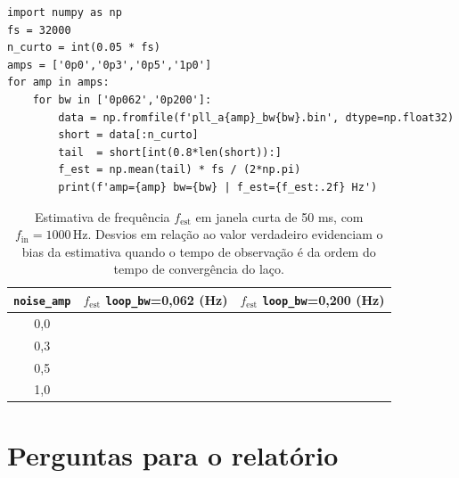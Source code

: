 \documentclass[11pt,a4paper]{article}
\begin{document}
\begin{instrucao}
\begin{verbatim}
import numpy as np
fs = 32000
n_curto = int(0.05 * fs)
amps = ['0p0','0p3','0p5','1p0']
for amp in amps:
    for bw in ['0p062','0p200']:
        data = np.fromfile(f'pll_a{amp}_bw{bw}.bin', dtype=np.float32)
        short = data[:n_curto]
        tail  = short[int(0.8*len(short)):]
        f_est = np.mean(tail) * fs / (2*np.pi)
        print(f'amp={amp} bw={bw} | f_est={f_est:.2f} Hz')
\end{verbatim}
\end{instrucao}

\begin{table}[H]
  \centering
  \begin{tabular}{c c c}
    \toprule
    \texttt{noise\_amp} & $f_\text{est}$ \texttt{loop\_bw}=0{,}062 (Hz) & $f_\text{est}$ \texttt{loop\_bw}=0{,}200 (Hz) \\
    \midrule
    0{,}0 & & \\
    0{,}3 & & \\
    0{,}5 & & \\
    1{,}0 & & \\
    \bottomrule
  \end{tabular}
  \caption{Estimativa de frequência $f_\text{est}$ em janela curta de 50 ms, com $f_\text{in} = 1000$\,Hz. Desvios em relação ao valor verdadeiro evidenciam o bias da estimativa quando o tempo de observação é da ordem do tempo de convergência do laço.}
  \label{tab:bias_curto}
\end{table}

\section{Perguntas para o relatório}
\end{document}
